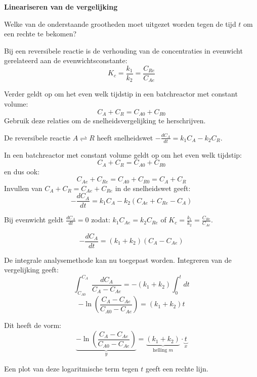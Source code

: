 \documentclass{ximera}
\begin{document}
\begin{question} \textbf{Lineariseren van de vergelijking}

Welke van de onderstaande grootheden moet uitgezet worden tegen de tijd $t$ om een rechte te bekomen?

\begin{multipleChoice}
\end{multipleChoice}

\begin{hint} \text{ }

     Bij een reversibele reactie is de verhouding van de concentraties in evenwicht gerelateerd aan de evenwichtsconstante:
\[
K_c = \frac{k_1}{k_2} = \frac{C_{Re}}{C_{Ae}}
\]

Verder geldt op om het even welk tijdstip in een batchreactor met constant volume:
\[
C_A + C_R = C_{A0} + C_{R0}
\]
Gebruik deze relaties om de snelheidsvergelijking te herschrijven.
\end{hint}

\begin{feedback} \text{  }

De reversibele reactie $A \rightleftharpoons R$ heeft snelheidswet $- \frac{dC_A}{dt} = k_1 C_A - k_2 C_R$.

In een batchreactor met constant volume geldt op om het even welk tijdstip:
\[
C_A + C_R = C_{A0} + C_{R0} 
\]
en dus ook: \[
C_{Ae} + C_{Re} = C_{A0} + C_{R0} = C_A + C_R
\]
Invullen van $C_{A} + C_{R} = C_{Ae} + C_{Re}$ in de snelheidswet geeft:
\[
- \frac{dC_A}{dt} = k_1 C_A - k_2 (C_{Ae} + C_{Re} - C_A)
\]

Bij evenwicht geldt $\frac{dC_A}{dt} = 0$ zodat: 
$k_1 C_{Ae} = k_2C_{Re}$ of $K_c = \frac{k_1}{k_2} = \frac{C_{Re}}{C_{Ae}}$.

\[
- \frac{dC_A}{dt} = (k_1 + k_2)(C_A - C_{Ae})
\]

De integrale analysemethode kan nu toegepast worden. Integreren van de vergelijking geeft:
\[
\int_{C_{A0}}^{C_A} \frac{dC_A}{C_A - C_{Ae}}
=
- (k_1 + k_2)\int_0^t dt
\]
\[
- \ln\left(\frac{C_A - C_{Ae}}{C_{A0} - C_{Ae}}\right)
= (k_1 + k_2)t
\]


Dit heeft de vorm:
\[
\underbrace{- \ln\left(\frac{C_A - C_{Ae}}{C_{A0} - C_{Ae}}\right)}_{y}
=
\underbrace{(k_1 + k_2)}_{\text{helling } m}
\cdot
\underbrace{t}_{x}
\]

Een plot van deze logaritmische term tegen $t$ geeft een rechte lijn.

\end{feedback}
\end{question}
\end{document}

